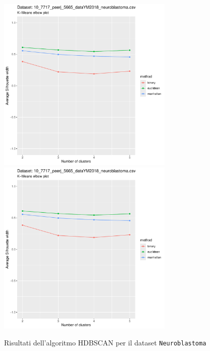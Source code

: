 \documentclass[a4paper, 12pt]{report}
\begin{document}
			\begin{figure}[H]
				\centering
				\includegraphics[width = 0.75\textwidth, height = 0.45\textheight, page = 7]{
					results/results_Neuroblastoma.csv.pdf
				}
				\includegraphics[width = 0.75\textwidth, height = 0.45\textheight, page = 8]{
					results/results_Neuroblastoma.csv.pdf
				}
				\caption{Risultati dell'algoritmo HDBSCAN per il dataset
				\texttt{Neuroblastoma}}
				\label{fig:hdbscan3}
			\end{figure}
\end{document}
